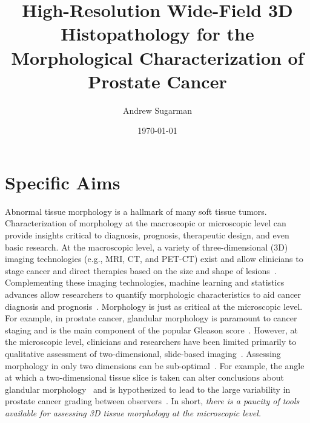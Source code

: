 \documentclass{NIHGrant}
\author{Andrew Sugarman}
\date{\today}
\title{High-Resolution Wide-Field 3D Histopathology for the Morphological Characterization of Prostate Cancer}
\theoremstyle{theorem}
\begin{document}
\maketitle
\newpage
\part*{Specific Aims}

Abnormal tissue morphology is a hallmark of many soft tissue tumors. Characterization of morphology at the macroscopic or microscopic level can provide insights critical to diagnosis, prognosis, therapeutic design, and even basic research. At the macroscopic level, a variety of three-dimensional (3D) imaging technologies (e.g., MRI, CT, and PET-CT) exist and allow clinicians to stage cancer and direct therapies based on the size and shape of lesions~\cite{primakov_automated_2022,katiyar_quantification_2023}. Complementing these imaging technologies, machine learning and statistics advances allow researchers to quantify morphologic characteristics to aid cancer diagnosis and prognosis~\cite{lawson_persistent_2019,crawford_predicting_2020}.
Morphology is just as critical at the microscopic level. For example, in prostate cancer, glandular morphology is paramount to cancer staging and is the main component of the popular Gleason score~\cite{gordetsky_grading_2016,epstein_prostate_2018}. However, at the microscopic level, clinicians and researchers have been limited primarily to qualitative assessment of two-dimensional, slide-based imaging~\cite{liu_harnessing_2021}. Assessing morphology in only two dimensions can be sub-optimal~\cite{ozkan_interobserver_2016,xie_prostate_2022,koyuncu_visual_2023}. For example, the angle at which a two-dimensional tissue slice is taken can alter conclusions about glandular morphology~\cite{serafin_nondestructive_2023} and is hypothesized to lead to the large variability in prostate cancer grading between observers~\cite{serafin_nondestructive_2023,flach_significant_2021}. In short, \emph{there is a paucity of tools available for assessing 3D tissue morphology at the microscopic level.}
\end{document}
